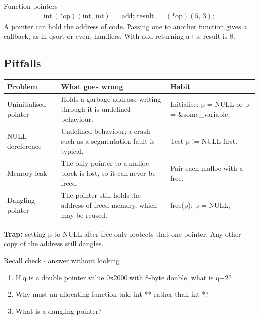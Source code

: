 \documentclass[11pt]{article}
\begin{document}
\begin{keepsection}
\begin{keepsection}
\begin{equationcard}{Function pointers}
\[ \begin{gathered} \text{int}\, (*\text{op})(\text{int},\, \text{int})\, =\, \text{add};\, \text{result}\, =\, (*\text{op})(5,\, 3); \end{gathered} \]
{\small A pointer can hold the address of code. Passing one to another function gives a callback, as in qsort or event handlers. With add returning a+b, result is 8.}
\end{equationcard}
\end{keepsection}

\begin{keepsection}
\subsection{Pitfalls}

\begin{center}\small\begin{tabularx}{\linewidth}{>{\raggedright\arraybackslash}X>{\raggedright\arraybackslash}X>{\raggedright\arraybackslash}X}\toprule
\textbf{Problem} & \textbf{What goes wrong} & \textbf{Habit} \\ \midrule
Uninitialised pointer & Holds a garbage address; writing through it is undefined behaviour. & Initialise: p = NULL or p = \&some\_variable. \\
NULL dereference & Undefined behaviour; a crash such as a segmentation fault is typical. & Test p != NULL first. \\
Memory leak & The only pointer to a malloc block is lost, so it can never be freed. & Pair each malloc with a free. \\
Dangling pointer & The pointer still holds the address of freed memory, which may be reused. & free(p); p = NULL; \\
\bottomrule\end{tabularx}\end{center}

\begin{notebox}\textbf{Trap:} setting p to NULL after free only protects that one pointer. Any other copy of the address still dangles.\end{notebox}

\begin{recallbox}{Recall check \ensuremath{\cdot} answer without looking}
\begin{enumerate}
\item If q is a double pointer value 0x2000 with 8-byte double, what is q+2?
\item Why must an allocating function take int ** rather than int *?
\item What is a dangling pointer?
\end{enumerate}

\end{recallbox}
\end{keepsection}
\end{keepsection}
\end{document}
